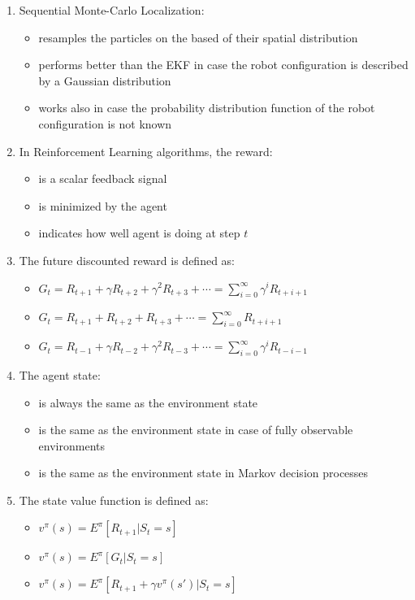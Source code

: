 \documentclass[openany]{book}
\theoremstyle{definition}
\theoremstyle{remark}
\begin{document}
\begin{enumerate}
    \item Sequential Monte-Carlo Localization:
    \begin{itemize}
        \item[] resamples the particles on the based of their spatial distribution
        \item[] performs better than the EKF in case the robot configuration is described by a Gaussian distribution
        \item[\checkmark] works also in case the probability distribution function of the robot configuration is not known
    \end{itemize}

    \item In Reinforcement Learning algorithms, the reward:
    \begin{itemize}
        \item[\checkmark] is a scalar feedback signal
        \item[] is minimized by the agent
        \item[\checkmark] indicates how well agent is doing at step $t$
    \end{itemize}

    \item The future discounted reward is defined as:
    \begin{itemize}
        \item[\checkmark] $G_t = R_{t+1} + \gamma R_{t+2} + \gamma^2R_{t+3} + \cdots = \sum_{i=0}^\infty \gamma^i R_{t+i+1}$
        \item[] $G_t = R_{t+1} + R_{t+2} + R_{t+3} + \cdots = \sum_{i=0}^\infty R_{t+i+1}$
        \item[] $G_t = R_{t-1} + \gamma R_{t-2} + \gamma^2R_{t-3} + \cdots = \sum_{i=0}^\infty \gamma^i R_{t-i-1}$
    \end{itemize}

    \item The agent state:
    \begin{itemize}
        \item[] is always the same as the environment state
        \item[\checkmark] is the same as the environment state in case of fully observable environments
        \item[\checkmark] is the same as the environment state in Markov decision processes
    \end{itemize}

    \item The state value function is defined as:
    \begin{itemize}
        \item[] $v^\pi(s) = E^\pi[R_{t+1}|S_t = s]$
        \item[\checkmark] $v^\pi(s) = E^\pi[G_t|S_t = s]$
        \item[\checkmark] $v^\pi(s) = E^\pi[R_{t+1} + \gamma v^\pi(s')|S_t = s]$
    \end{itemize}
\end{enumerate}
\end{document}
